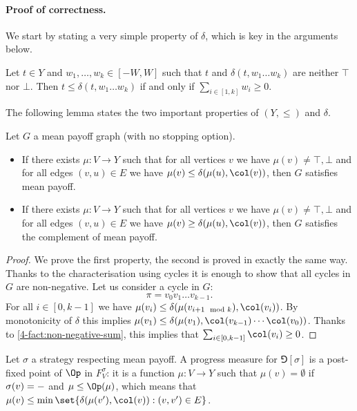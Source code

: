 \paragraph{\bf Proof of correctness.}
We start by stating a very simple property of $\delta$, which is key in the arguments below.

\begin{fact}
\label{4-fact:non-negative-sum}
Let $t \in Y$ and $w_1,\dots,w_k \in [-W,W]$ such that $t$ and $\delta(t,w_1 \dots w_k)$ are neither $\top$ nor $\bot$.
Then $t \le \delta(t,w_1 \dots w_k)$ if and only if $\sum_{i \in [1,k]} w_i \ge 0$.
\end{fact}

The following lemma states the two important properties of $(Y,\le)$ and $\delta$.

\begin{lemma}
\label{4-lem:key_property}
Let $G$ a mean payoff graph (with no stopping option).
\begin{itemize}
	\item If there exists $\mu : V \to Y$ such that for all vertices $v$ we have $\mu(v) \neq \top,\bot$
	and for all edges $(v,u) \in E$ we have $\mu(v) \le \delta(\mu(u),\col(v))$,
	then $G$ satisfies mean payoff.
	\item If there exists $\mu : V \to Y$ such that for all vertices $v$ we have $\mu(v) \neq \top,\bot$
	and for all edges $(v,u) \in E$ we have $\mu(v) \ge \delta(\mu(u),\col(v))$,
	then $G$ satisfies the complement of mean payoff.
\end{itemize}
\end{lemma}
\begin{proof}
We prove the first property, the second is proved in exactly the same way.
Thanks to the characterisation using cycles it is enough to show that all cycles in $G$ are non-negative.
Let us consider a cycle in $G$:
\[
\pi = v_0 v_1 \dots v_{k-1}.
\]
For all $i \in [0,k-1]$ we have $\mu(v_i) \le \delta(\mu(v_{i+1 \mod k}),\col(v_i))$.
By monotonicity of $\delta$ this implies $\mu(v_1) \le \delta(\mu(v_1),\col(v_{k-1}) \cdots \col(v_0))$.
Thanks to \cref{4-fact:non-negative-sum}, this implies that $\sum_{i \in [0,k-1]} \col(v_i) \ge 0$.
\end{proof}

Let $\sigma$ a strategy respecting mean payoff. 
A progress measure for $\Game[\sigma]$ is a post-fixed point of $\Op$ in $F^\sigma_V$:
it is a function $\mu : V \to Y$ such that $\mu(v) = \emptyset$ if $\sigma(v) = \mathtt{-}$ and $\mu \le \Op(\mu)$,
which means that $\mu(v) \le \min \set{ \delta(\mu(v'),\col(v)) : (v,v') \in E}$.

